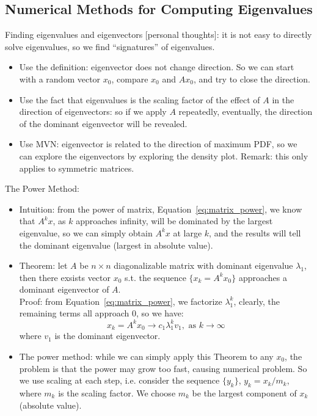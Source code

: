 \documentclass{report}
\begin{document}
\subsection{Numerical Methods for Computing Eigenvalues}

Finding eigenvalues and eigenvectors [personal thoughts]: it is not easy to directly solve eigenvalues, so we find ``signatures'' of eigenvalues. 
\begin{itemize}
	\item Use the definition: eigenvector does not change direction. So we can start with a random vector $x_0$, compare $x_0$ and $A x_0$, and try to close the direction. 
	
	\item Use the fact that eigenvalues is the scaling factor of the effect of $A$ in the direction of eigenvectors: so if we apply $A$ repeatedly, eventually, the direction of the dominant eigenvector will be revealed. 
	
	\item Use MVN: eigenvector is related to the direction of maximum PDF, so we can explore the eigenvectors by exploring the density plot. Remark: this only applies to symmetric matrices. 
\end{itemize}

The Power Method: 
\begin{itemize}
\item Intuition: from the power of matrix, Equation~\ref{eq:matrix_power}, we know that $A^k x$, as $k$ approaches infinity, will be dominated by the largest eigenvalue, so we can simply obtain $A^k x$ at large $k$, and the results will tell the dominant eigenvalue (largest in absolute value). 
	
\item Theorem: let $A$ be $n \times n$ diagonalizable matrix with dominant eigenvalue $\lambda_1$, then there exsists vector $x_0$ s.t. the sequence $\{x_k = A^k x_0\}$ approaches a dominant eigenvector of $A$. \\
Proof: from Equation~\ref{eq:matrix_power}, we factorize $\lambda_1^k$, clearly, the remaining terms all approach 0, so we have: 
\begin{equation}
x_k = A^k x_0 \rightarrow c_1 \lambda_1^k v_1, \text{ as } k \rightarrow \infty
\end{equation}
where $v_1$ is the dominant eigenvector. 
	
\item The power method: while we can simply apply this Theorem to any $x_0$, the problem is that the power may grow too fast, causing numerical problem. So we use scaling at each step, i.e. consider the sequence $\{y_k\}$, $y_k = x_k / m_k$, where $m_k$ is the scaling factor. We choose $m_k$ be the largest component of $x_k$ (absolute value). 
\end{itemize}
\end{document}
